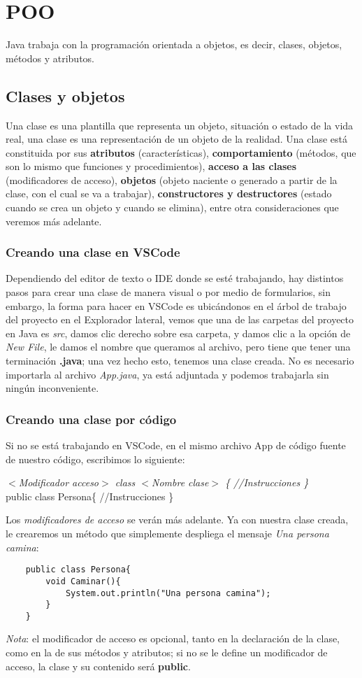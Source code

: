 \section{POO}
Java trabaja con la programación orientada a objetos, es decir, clases, objetos, métodos y atributos.

\subsection{Clases y objetos}
Una clase es una plantilla que representa un objeto, situación o estado de la vida real, una clase es una representación de un objeto de la realidad. Una clase está constituida por sus \textbf{atributos} (características), \textbf{comportamiento} (métodos, que son lo mismo que funciones y procedimientos), \textbf{acceso a las clases} (modificadores de acceso), \textbf{objetos} (objeto naciente o generado a partir de la clase, con el cual se va a trabajar), \textbf{constructores y destructores} (estado cuando se crea un objeto y cuando se elimina), entre otra consideraciones que veremos más adelante.

\subsubsection{Creando una clase en VSCode}
Dependiendo del editor de texto o IDE donde se esté trabajando, hay distintos pasos para crear una clase de manera visual o por medio de formularios, sin embargo, la forma para hacer en VSCode es ubicándonos en el árbol de trabajo del proyecto en el Explorador lateral, vemos que una de las carpetas del proyecto en Java es \textit{src}, damos clic derecho sobre esa carpeta, y damos clic a la opción de \textit{New File}, le damos el nombre que queramos al archivo, pero tiene que tener una terminación \textbf{.java}; una vez hecho esto, tenemos una clase creada. No es necesario importarla al archivo \textit{App.java}, ya está adjuntada y podemos trabajarla sin ningún inconveniente.

\subsubsection{Creando una clase por código}
Si no se está trabajando en VSCode, en el mismo archivo App de código fuente de nuestro código, escribimos lo siguiente:\begin{center}\textit{$<$Modificador acceso$>$ class $<$Nombre clase$>$ \{ //Instrucciones \}}\\public class Persona\{ //Instrucciones \}\end{center}
Los \textit{modificadores de acceso} se verán más adelante. Ya con nuestra clase creada, le crearemos un método que simplemente despliega el mensaje \textit{Una persona camina}:
\begin{lstlisting}
    public class Persona{
        void Caminar(){
            System.out.println("Una persona camina");
        }
    }
\end{lstlisting}
\textit{Nota}: el modificador de acceso es opcional, tanto en la declaración de la clase, como en la de sus métodos y atributos; si no se le define un modificador de acceso, la clase y su contenido será \textbf{public}.

